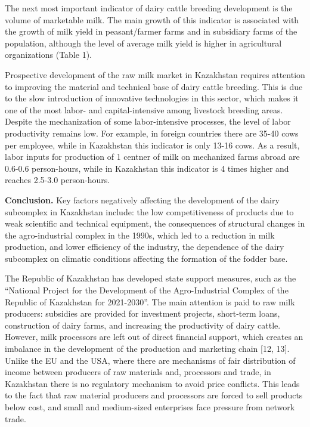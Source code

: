\begin{multicols}{2}
The next most important indicator of dairy cattle breeding development
is the volume of marketable milk. The main growth of this indicator is
associated with the growth of milk yield in peasant/farmer farms and in
subsidiary farms of the population, although the level of average milk
yield is higher in agricultural organizations (Table 1).

Prospective development of the raw milk market in Kazakhstan requires
attention to improving the material and technical base of dairy cattle
breeding. This is due to the slow introduction of innovative
technologies in this sector, which makes it one of the most labor- and
capital-intensive among livestock breeding areas. Despite the
mechanization of some labor-intensive processes, the level of labor
productivity remains low. For example, in foreign countries there are
35-40 cows per employee, while in Kazakhstan this indicator is only
13-16 cows. As a result, labor inputs for production of 1 centner of
milk on mechanized farms abroad are 0.6-0.6 person-hours, while in
Kazakhstan this indicator is 4 times higher and reaches 2.5-3.0
person-hours.

{\bfseries Conclusion.} Key factors negatively affecting the development of
the dairy subcomplex in Kazakhstan include: the low competitiveness of
products due to weak scientific and technical equipment, the
consequences of structural changes in the agro-industrial complex in the
1990s, which led to a reduction in milk production, and lower efficiency
of the industry, the dependence of the dairy subcomplex on climatic
conditions affecting the formation of the fodder base.

The Republic of Kazakhstan has developed state support measures, such as
the ``National Project for the Development of the Agro-Industrial
Complex of the Republic of Kazakhstan for 2021-2030''. The main
attention is paid to raw milk producers: subsidies are provided for
investment projects, short-term loans, construction of dairy farms, and
increasing the productivity of dairy cattle. However, milk processors
are left out of direct financial support, which creates an imbalance in
the development of the production and marketing chain {[}12, 13{]}.
Unlike the EU and the USA, where there are mechanisms of fair
distribution of income between producers of raw materials and,
processors and trade, in Kazakhstan there is no regulatory mechanism to
avoid price conflicts. This leads to the fact that raw material
producers and processors are forced to sell products below cost, and
small and medium-sized enterprises face pressure from network trade.


\end{multicols}
